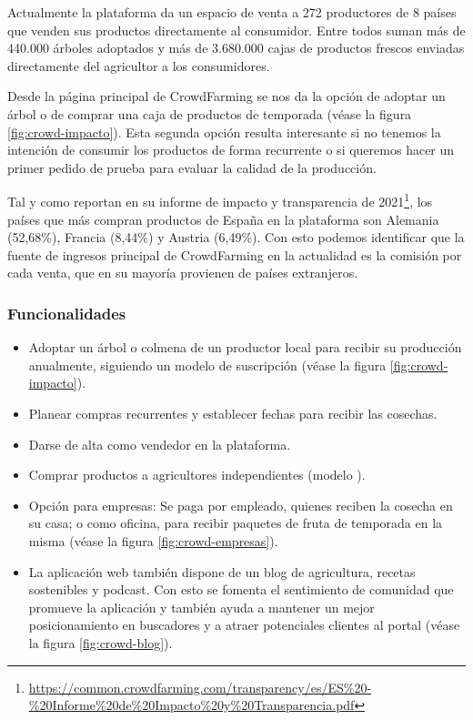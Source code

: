 Actualmente la plataforma da un espacio de venta a 272 productores de 8 países que venden sus productos directamente al consumidor. Entre todos suman más de 440.000 árboles adoptados y más de 3.680.000 cajas de productos frescos enviadas directamente del agricultor a los consumidores.

Desde la página principal de CrowdFarming se nos da la opción de adoptar un árbol o de comprar una caja de productos de temporada (véase la figura \ref{fig:crowd-impacto}). Esta segunda opción resulta interesante si no tenemos la intención de consumir los productos de forma recurrente o si queremos hacer un primer pedido de prueba para evaluar la calidad de la producción.

Tal y como reportan en su informe de impacto y transparencia de 2021\footnote{\url{https://common.crowdfarming.com/transparency/es/ES\%20-\%20Informe\%20de\%20Impacto\%20y\%20Transparencia.pdf}}, los países que más compran productos de España en la plataforma son Alemania (52,68\%), Francia (8,44\%) y Austria (6,49\%). Con esto podemos identificar que la fuente de ingresos principal de CrowdFarming en la actualidad es la comisión por cada venta, que en su mayoría provienen de países extranjeros.

\subsubsection{Funcionalidades}

\begin{itemize}

	\item Adoptar un árbol o colmena de un productor local para recibir su producción anualmente, siguiendo un modelo de suscripción (véase la figura \ref{fig:crowd-impacto}).

	\item Planear compras recurrentes y establecer fechas para recibir las cosechas.

	\item Darse de alta como vendedor en la plataforma.

	\item Comprar productos a agricultores independientes (modelo ).

	\item Opción para empresas: Se paga por empleado, quienes reciben la cosecha en su casa; o como oficina, para recibir paquetes de fruta de temporada en la misma (véase la figura \ref{fig:crowd-empresas}).

	\item La aplicación web también dispone de un blog de agricultura, recetas sostenibles y podcast. Con esto se fomenta el sentimiento de comunidad que promueve la aplicación y también ayuda a mantener un mejor posicionamiento en buscadores y a atraer potenciales clientes al portal (véase la figura \ref{fig:crowd-blog}).

\end{itemize}

